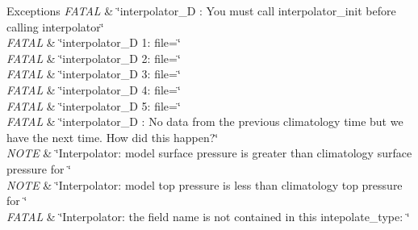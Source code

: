 \begin{DoxyExceptions}{Exceptions}
{\em F\+A\+T\+AL} & \char`\"{}interpolator\+\_\+D \+: You must call interpolator\+\_\+init
                before calling interpolator\char`\"{} \\
\hline
{\em F\+A\+T\+AL} & \char`\"{}interpolator\+\_\+D 1\+:  file=\char`\"{} \\
\hline
{\em F\+A\+T\+AL} & \char`\"{}interpolator\+\_\+D 2\+:  file=\char`\"{} \\
\hline
{\em F\+A\+T\+AL} & \char`\"{}interpolator\+\_\+D 3\+:  file=\char`\"{} \\
\hline
{\em F\+A\+T\+AL} & \char`\"{}interpolator\+\_\+D 4\+:  file=\char`\"{} \\
\hline
{\em F\+A\+T\+AL} & \char`\"{}interpolator\+\_\+D 5\+:  file=\char`\"{} \\
\hline
{\em F\+A\+T\+AL} & \char`\"{}interpolator\+\_\+D \+: No data from the previous climatology
                time but we have the next time. How did this happen?\char`\"{} \\
\hline
{\em N\+O\+TE} & \char`\"{}\+Interpolator\+: model surface pressure is greater than
              climatology surface pressure for \char`\"{} \\
\hline
{\em N\+O\+TE} & \char`\"{}\+Interpolator\+: model top pressure is less than
                climatology top pressure for \char`\"{} \\
\hline
{\em F\+A\+T\+AL} & \char`\"{}\+Interpolator\+: the field name is not contained in this
                intepolate\+\_\+type\+: \char`\"{} \\
\hline
\end{DoxyExceptions}
\mbox{\label{interfaceinterpolator__mod_1_1interpolator_ab6c66439c87afee2373fe8fa164b138b}} 
